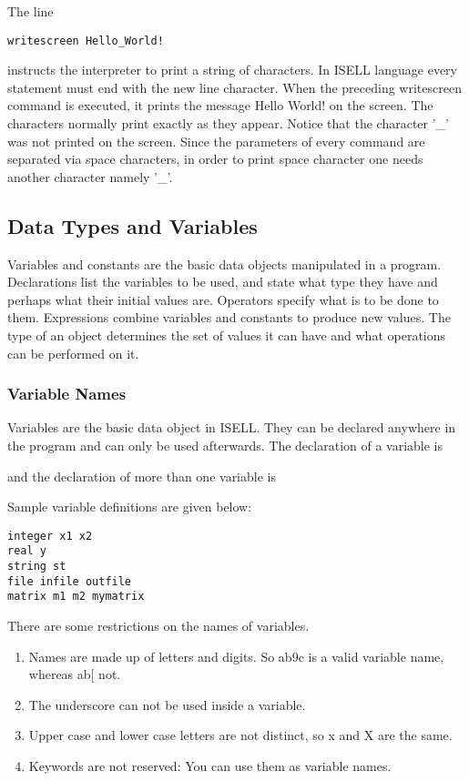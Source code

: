 \documentclass[a4paper,12pt]{book}
\begin{document}
The line
\begin{verbatim}
writescreen Hello_World!
\end{verbatim}
instructs the interpreter to print a string of characters. In ISELL language every statement must end
with the new line character. When the preceding writescreen command is executed, it prints the message Hello World! on the screen. The characters normally print exactly as they appear. Notice that the character '\_' was not printed on the screen. Since the parameters of every command are separated via space characters, in order to print space character one needs another character namely '\_'.

\subsection{Data Types and Variables}
Variables and constants are the basic data objects manipulated in a program. Declarations list the variables to be used, and state what type they have and perhaps what their initial values are. Operators specify what is to be done to them. Expressions combine variables and constants to produce new values. The type of an object determines the set of values it can have and what operations can be performed on it.

\subsubsection{Variable Names}
Variables are the basic data object in ISELL. They can be declared anywhere in the program and can only be used afterwards. The declaration of a variable is
\begin{center}
\end{center}
and the declaration of more than one variable is
\begin{center}
\end{center}

Sample variable definitions are given below:
\begin{verbatim}
integer x1 x2
real y
string st
file infile outfile
matrix m1 m2 mymatrix
\end{verbatim}

There are some restrictions on the names of variables.
\begin{enumerate}
\item Names are made up of letters and digits. So ab9c is a valid variable name, whereas ab[ not.
\item The underscore can not be used inside a variable.
\item Upper case and lower case letters are not distinct, so x and X are the same.
\item Keywords are not reserved: You can use them as variable names.
\end{enumerate}
\end{document}
